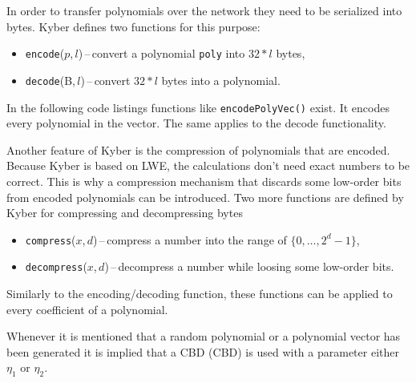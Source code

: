 In order to transfer polynomials over the network they need to be serialized into bytes. Kyber defines two functions for this purpose:
\begin{itemize}
  \item \texttt{encode}($p$,\,$l$)\,--\,convert a polynomial \texttt{poly} into $32*l$ bytes,
  \item \texttt{decode}(B,\,$l$)\,--\,convert $32*l$ bytes into a polynomial.
\end{itemize}
In the following code listings functions like \texttt{encodePolyVec()} exist. It encodes every polynomial in the vector. The same applies to the decode functionality.

Another feature of Kyber is the compression of polynomials that are encoded. Because Kyber is based on LWE, the calculations don't need exact numbers to be correct. This is why a compression mechanism that discards some low-order bits from encoded polynomials can be introduced. Two more functions are defined by Kyber for compressing and decompressing bytes
\begin{itemize}
  \item \texttt{compress}($x$,\,$d$)\,--\,compress a number into the range of $\{0,\dots,2^d-1\}$,
  \item \texttt{decompress}($x$,\,$d$)\,--\,decompress a number while loosing some low-order bits.
\end{itemize}
Similarly to the encoding/decoding function, these functions can be applied to every coefficient of a polynomial.

Whenever it is mentioned that a random polynomial or a polynomial vector has been generated it is implied that a CBD (\acl{CBD}) is used with a parameter either $\eta_1$ or $\eta_2$.
